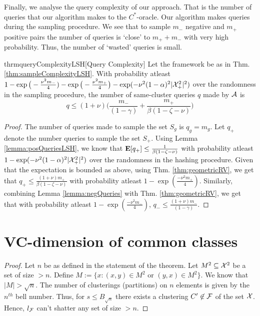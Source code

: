 Finally, we analyse the query complexity of our approach. That is the number of queries that our algorithm makes to the $C^*$-oracle. Our algorithm makes queries during the sampling procedure. We see that to sample $m_-$ negative and $m_+$ positive pairs the number of queries is `close' to $m_+ + m_-$ with very high probability. Thus, the number of `wasted' queries is small.  

\begin{restatable}{thrm}{queryComplexityLSH}[Query Complexity]
\label{thm:queryComplexity}
Let the framework be as in Thm. \ref{thm:sampleComplexityLSH}. With probability atleast $1-\exp\big(-\frac{\nu^2m_-}{4}) - \exp\big(-\frac{\nu^2m_+}{4}\big) - \exp(-\nu^2(1-\alpha)^2|\mathcal X_+^2|^2)$ over the randomness in the sampling procedure, the number of same-cluster queries $q$ made by $\mathcal A$ is  
$$q \le (1+\nu)\bigg(\frac{m_-}{(1-\gamma)} + \frac{m_+}{\beta(1-\zeta-\nu)}\bigg)$$
\end{restatable}

\begin{proof}
The number of queries made to sample the set $S_g$ is $q_g = m_g$. Let $q_+$ denote the number queries to sample the set $S_+$. Using Lemma \ref{lemma:posQueriesLSH}, we know that $\mathbf E[q_+] \le \frac{1}{\beta(1-\zeta-\nu)}$ with probability atleast $1-\exp(-\nu^2(1-\alpha)^2|\mathcal X_+^2|^2)$ over the randomness in the hashing procedure. Given that the expectation is bounded as above, using Thm. \ref{thm:geometricRV}, we get that $q_+ \le \frac{(1+\nu)m_+}{\beta(1-\zeta-\nu)}$ with probability atleast $1-\exp(\frac{-\nu^2m_+}{4})$. Similarly, combining Lemma \ref{lemma:negQueries} with Thm. \ref{thm:geometricRV}, we get that with probability atleast $1-\exp(\frac{-\nu^2m_-}{4})$, $q_- \le \frac{(1+\nu)m_-}{(1-\gamma)}$.
\end{proof}

\section{VC-dimension of common classes}
\VCDim*
\begin{proof}
Let $n$ be as defined in the statement of the theorem. Let $M^2 \subseteq \mathcal X^2$ be a set of size $> n$. Define $M := \{x: (x, y) \in M^2 \text{ or } (y, x) \in M^2\}$. We know that $|M| > \sqrt n$. The number of clusterings (partitions) on $n$ elements is given by the $n^{th}$ bell number. Thus, for $s \le B_{\sqrt n}$ there exists a clustering $C' \not\in \mathcal F$ of the set $\mathcal X$. Hence, $l_{\mathcal F}$ can't shatter any set of size $> n$.
\end{proof}

